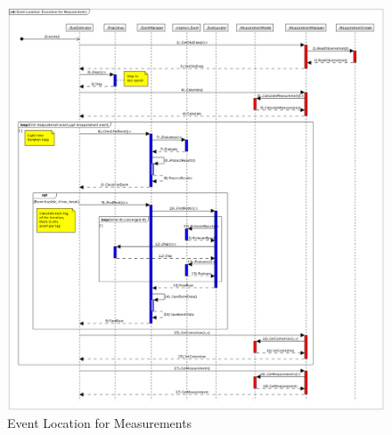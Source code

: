 \begin{figure}
\begin{center}
\includegraphics[scale=0.36]{Images/EventLocationExecutionforMeasurements.eps}
\caption{\label{fig:MeasurementLocationSD}Event Location for Measurements}
\end{center}
\end{figure}